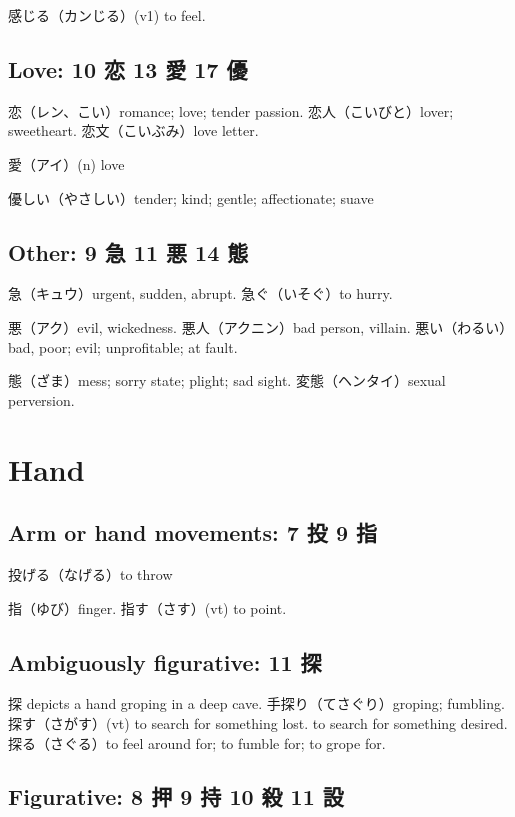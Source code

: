 感じる（カンじる）(v1) to feel.

\subsection{Love: 10 恋 13 愛 17 優}

恋（レン、こい）romance; love; tender passion.
恋人（こいびと）lover; sweetheart.
恋文（こいぶみ）love letter.

愛（アイ）(n) love

優しい（やさしい）tender; kind; gentle; affectionate; suave

\subsection{Other: 9 急 11 悪 14 態}

急（キュウ）urgent, sudden, abrupt.
急ぐ（いそぐ）to hurry.

悪（アク）evil, wickedness.
悪人（アクニン）bad person, villain.
悪い（わるい）bad, poor; evil; unprofitable; at fault.

態（ざま）mess; sorry state; plight; sad sight.
変態（ヘンタイ）sexual perversion.

\section{Hand}

\subsection{Arm or hand movements: 7 投 9 指}

投げる（なげる）to throw

指（ゆび）finger.
指す（さす）(vt) to point.

\subsection{Ambiguously figurative: 11 探}

探 depicts a hand groping in a deep cave.
手探り（てさぐり）groping; fumbling.
探す（さがす）(vt)
to search for something lost.
to search for something desired.
探る（さぐる）to feel around for; to fumble for; to grope for.

\subsection{Figurative: 8 押 9 持 10 殺 11 設}

